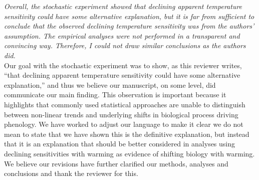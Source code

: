 \documentclass[11pt]{article}
\begin{document}
\emph{Overall, the stochastic experiment showed that declining apparent temperature sensitivity could have some alternative explanation, but it is far from sufficient to conclude that the observed declining temperature sensitivity was from the authors' assumption. The empirical analyses were not performed in a transparent and convincing way. Therefore, I could not draw similar conclusions as the authors did.}\\

Our goal with the stochastic experiment was to show, as this reviewer writes, ``that declining apparent temperature sensitivity could have some alternative explanation,'' and thus we believe our manuscript, on some level, did communicate our main finding. This observation is important because it highlights that commonly used statistical approaches are unable to distinguish between non-linear trends and underlying shifts in biological process driving phenology. We have worked to adjust our language to make it clear we do not mean to state that we have shown this is the definitive explanation, but instead that it is an explanation that should be better considered in analyses using declining sensitivities with warming as evidence of shifting biology with warming. We believe our revisions have further clarified our methods, analyses and conclusions and thank the reviewer for this.



\end{document}

